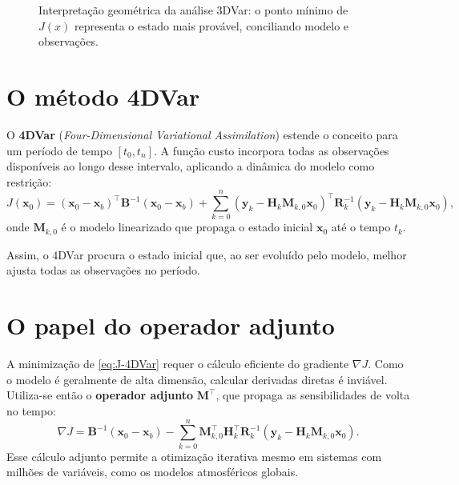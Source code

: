 \begin{figure}[h!]
\centering
{}
\caption{Interpretação geométrica da análise 3DVar: o ponto mínimo de $J(x)$ representa o estado mais provável, conciliando modelo e observações.}
\label{fig:3dvar-cost}
\end{figure}

\section{O método 4DVar}
O \textbf{4DVar} (\emph{Four-Dimensional Variational Assimilation}) estende o conceito para um período de tempo $[t_0, t_n]$.  
A função custo incorpora todas as observações disponíveis ao longo desse intervalo, aplicando a dinâmica do modelo como restrição:
\begin{equation}
J(\mathbf{x}_0) = (\mathbf{x}_0 - \mathbf{x}_b)^\top \mathbf{B}^{-1} (\mathbf{x}_0 - \mathbf{x}_b)
+ \sum_{k=0}^{n} (\mathbf{y}_k - \mathbf{H}_k \mathbf{M}_{k,0} \mathbf{x}_0)^\top
\mathbf{R}_k^{-1} (\mathbf{y}_k - \mathbf{H}_k \mathbf{M}_{k,0} \mathbf{x}_0),
\label{eq:J-4DVar}
\end{equation}
onde $\mathbf{M}_{k,0}$ é o modelo linearizado que propaga o estado inicial $\mathbf{x}_0$ até o tempo $t_k$.

Assim, o 4DVar procura o estado inicial que, ao ser evoluído pelo modelo, melhor ajusta todas as observações no período.

\section{O papel do operador adjunto}
A minimização de \eqref{eq:J-4DVar} requer o cálculo eficiente do gradiente $\nabla J$.  
Como o modelo é geralmente de alta dimensão, calcular derivadas diretas é inviável.  
Utiliza-se então o \textbf{operador adjunto} $\mathbf{M}^\top$, que propaga as sensibilidades de volta no tempo:
\[
\nabla J = \mathbf{B}^{-1} (\mathbf{x}_0 - \mathbf{x}_b)
- \sum_{k=0}^{n} \mathbf{M}_{k,0}^\top \mathbf{H}_k^\top \mathbf{R}_k^{-1}
(\mathbf{y}_k - \mathbf{H}_k \mathbf{M}_{k,0} \mathbf{x}_0).
\]
Esse cálculo adjunto permite a otimização iterativa mesmo em sistemas com milhões de variáveis, como os modelos atmosféricos globais.

